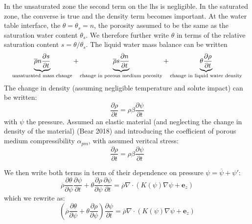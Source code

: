 \documentclass{article}
\begin{document}
In the unsaturated zone the second term on the lhs is negligible. In the saturated zone, the converse is true and the density term becomes important. At the water table interface, the $\theta=\theta_s=n$, the porosity assumed to be the same as the saturation water content $\theta_{s}$. We therefore further write $\theta$ in terms of the relative saturation content $s=\theta/\theta_s$.
The liquid water mass balance can be written
\begin{equation}
\underbrace{{\overline \rho} n \frac{\partial s}{\partial t} }_\text{\rm unsaturated mass change} + \underbrace{{\overline \rho} s \frac{\partial n}{\partial t}  }_\text{\rm change in porous medium porosity}  
+ 
\underbrace{\theta \frac{\partial \rho}{\partial t}   }_\text{\rm change in liquid water density}  

\end{equation}
The change in density (assuming negligible temperature and solute impact) can be written:
\begin{equation}
\frac{\partial \rho}{\partial t} = \rho \beta \frac{\partial \psi}{\partial t}
\end{equation}
with $\psi$ the pressure.
Assumed an elastic material (and neglecting the change in density of the material) (Bear 2018) and introducing the coefficient of porous medium compressibility $\alpha_{pm}$, with assumed veritcal stress:
\begin{equation}
\frac{\partial \rho}{\partial t} = \rho \beta \frac{\partial \psi}{\partial t}
\end{equation}






We then write both terms in term of their dependence on pressure $\psi = \overline{\psi}+\psi'$:
\begin{equation}
{\overline \rho} \frac{\partial \theta}{\partial \psi}\frac{\partial \psi}{\partial t} + \theta \frac{\partial \rho}{\partial \psi} \frac{\partial \psi}{\partial t} = {\overline \rho} \nabla \cdot \left( K(\psi) \nabla \psi + {\mathbf e_z} \right)
\end{equation}
which we rewrite as:
\begin{equation}
\left( {\overline \rho} \frac{\partial \theta}{\partial \psi} + \theta \frac{\partial \rho}{\partial \psi} \right)\frac{\partial \psi}{\partial t} = {\overline \rho} \nabla \cdot \left( K(\psi) \nabla \psi + {\mathbf e_z} \right)
\end{equation}
\end{document}
